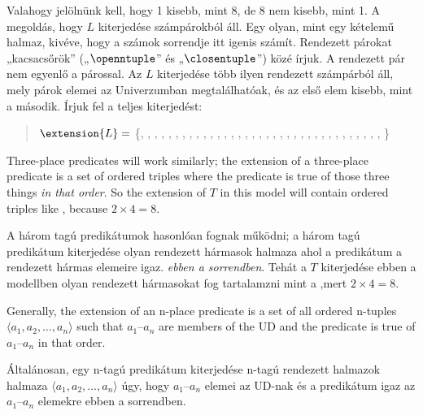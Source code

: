 Valahogy jelölnünk kell, hogy 1 kisebb, mint 8, de 8 nem kisebb, mint 1. A megoldás, hogy $L$ kiterjedése számpárokból áll. Egy   olyan, mint egy kételemű halmaz, kivéve, hogy a számok sorrendje itt igenis számít. Rendezett párokat „kacsacsőrök” („$\openntuple$” és „$\closentuple$”) közé írjuk.  A rendezett pár \mbox{} nem egyenlő a \mbox{} párossal. Az $L$ kiterjedése több ilyen rendezett számpárból áll, mely párok elemei az Univerzumban megtalálhatóak, és az első elem kisebb, mint a második. Írjuk fel a teljes kiterjedést:


\begin{quote}
$\extension{L}=$ \{, , , , , , , ,
, , , , , , ,
, , , , , ,
, , , , ,
, , , ,
, , ,
, ,
%
\}
\end{quote}

Three-place predicates will work similarly; the extension of a three-place predicate is a set of ordered triples where the predicate is true of those three things \emph{in that order}. So the extension of $T$ in this model will contain ordered triples like , because $2\times 4 = 8$.

A három tagú predikátumok hasonlóan fognak működni; a három tagú predikátum kiterjedése olyan rendezett hármasok halmaza ahol a predikátum a rendezett hármas elemeire igaz. \emph{ebben a sorrendben}. Tehát a $T$ kiterjedése ebben a modellben olyan rendezett hármasokat fog tartalamzni mint a ,mert $2\times 4 = 8$.

Generally, the extension of an n-place predicate is a set of all ordered n-tuples ${\langle}a_1, a_2,\ldots, a_n{\rangle}$ such that $a_1$--$a_n$ are members of the UD and the predicate is true of $a_1$--$a_n$ in that order.

Általánosan, egy n-tagú predikátum kiterjedése  n-tagú rendezett halmazok halmaza ${\langle}a_1, a_2,\ldots, a_n{\rangle}$ úgy, hogy $a_1$--$a_n$ elemei az UD-nak és a predikátum igaz az  $a_1$--$a_n$ elemekre ebben a sorrendben.


